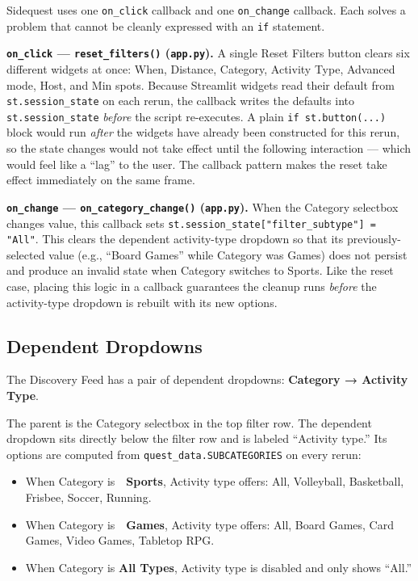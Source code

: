 \documentclass[11pt]{article}
\begin{document}
Sidequest uses one \texttt{on\_click} callback and one \texttt{on\_change} callback. Each solves a problem that cannot be cleanly expressed with an \texttt{if} statement.

\textbf{\texttt{on\_click} --- \texttt{reset\_filters()} (\texttt{app.py}).} A single Reset Filters button clears six different widgets at once: When, Distance, Category, Activity Type, Advanced mode, Host, and Min spots. Because Streamlit widgets read their default from \texttt{st.session\_state} on each rerun, the callback writes the defaults into \texttt{st.session\_state} \textit{before} the script re-executes. A plain \texttt{if st.button(...)} block would run \textit{after} the widgets have already been constructed for this rerun, so the state changes would not take effect until the following interaction --- which would feel like a ``lag'' to the user. The callback pattern makes the reset take effect immediately on the same frame.

\textbf{\texttt{on\_change} --- \texttt{on\_category\_change()} (\texttt{app.py}).} When the Category selectbox changes value, this callback sets \texttt{st.session\_state["filter\_subtype"] = "All"}. This clears the dependent activity-type dropdown so that its previously-selected value (e.g., ``Board Games'' while Category was Games) does not persist and produce an invalid state when Category switches to Sports. Like the reset case, placing this logic in a callback guarantees the cleanup runs \textit{before} the activity-type dropdown is rebuilt with its new options.

\subsection{Dependent Dropdowns}

The Discovery Feed has a pair of dependent dropdowns: \textbf{Category → Activity Type}.

The parent is the Category selectbox in the top filter row. The dependent dropdown sits directly below the filter row and is labeled ``Activity type.'' Its options are computed from \texttt{quest\_data.SUBCATEGORIES} on every rerun:

\begin{itemize}[nosep]
    \item When Category is \textbf{🏐 Sports}, Activity type offers: All, Volleyball, Basketball, Frisbee, Soccer, Running.
    \item When Category is \textbf{🎲 Games}, Activity type offers: All, Board Games, Card Games, Video Games, Tabletop RPG.
    \item When Category is \textbf{All Types}, Activity type is disabled and only shows ``All.''
\end{itemize}
\end{document}
